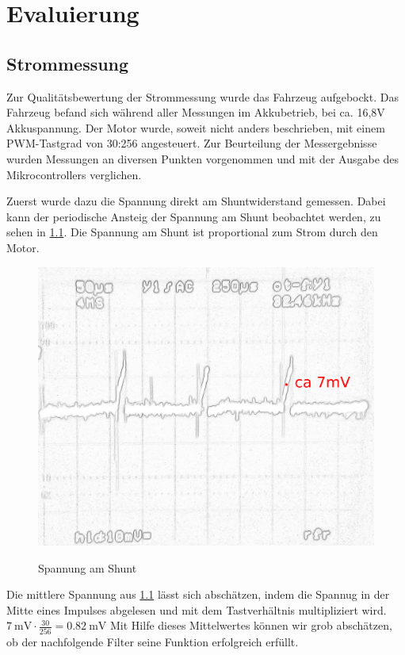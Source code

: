 \chapter{Evaluierung}



\section{Strommessung}

Zur Qualitätsbewertung der Strommessung wurde das Fahrzeug aufgebockt. 
Das Fahrzeug befand sich während aller Messungen im Akkubetrieb, bei ca. 16,8V Akkuspannung.
Der Motor wurde, soweit nicht anders beschrieben, mit einem PWM-Tastgrad von 30:256 angesteuert.
Zur Beurteilung der Messergebnisse wurden Messungen an diversen Punkten vorgenommen und mit der Ausgabe des Mikrocontrollers verglichen.

Zuerst wurde dazu die Spannung direkt am Shuntwiderstand gemessen.
Dabei kann der periodische Ansteig der Spannung am Shunt beobachtet werden, zu sehen in \cref{fig:filter_eingang}. Die Spannung am Shunt ist proportional zum Strom durch den Motor.

\begin{figure}[H]
\centering
\includegraphics[width=.8\textwidth]{filter_eingang_mak.png}\\
\caption{Spannung am Shunt}%
\label{fig:filter_eingang}
\end{figure}

Die mittlere Spannung aus \cref{fig:filter_eingang} lässt sich abschätzen, indem die Spannug in der Mitte eines Impulses abgelesen und mit dem Tastverhältnis multipliziert wird.
$\SI{7}{\mV}\cdot\frac{30}{256}=\SI{0,82}{\mV} $
Mit Hilfe dieses Mittelwertes können wir grob abschätzen, ob der nachfolgende Filter seine Funktion erfolgreich erfüllt.


